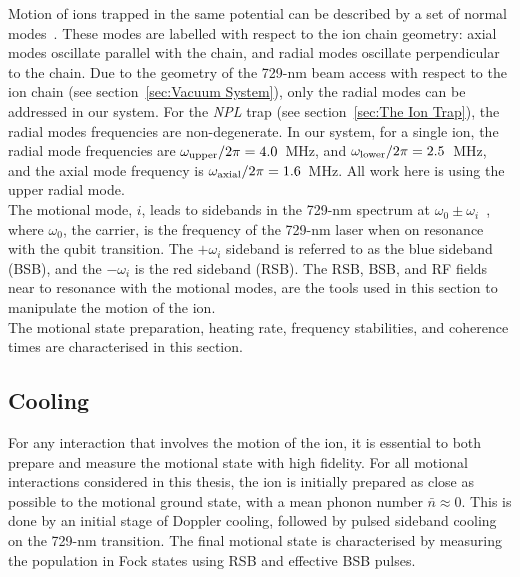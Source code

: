     Motion of ions trapped in the same potential can be described by a set of normal modes~\cite{james1998quantum}. These modes are labelled with respect to the ion chain geometry: axial modes oscillate parallel with the chain, and radial modes oscillate perpendicular to the chain. Due to the geometry of the 729-nm beam access with respect to the ion chain (see section~\ref{sec:Vacuum System}), only the radial modes can be addressed in our system. For the \emph{NPL} trap (see section~\ref{sec:The Ion Trap}), the radial modes frequencies are non-degenerate. In our system, for a single ion, the radial mode frequencies are $\omega_{\rm upper}/2\pi = 4.0$~\unit{\MHz}, and $\omega_{\rm lower}/2\pi = 2.5$~\unit{\MHz}, and the axial mode frequency is $\omega_{\rm axial}/2\pi = 1.6$~\unit{\MHz}. All work here is using the upper radial mode. \\
    The motional mode, $i$, leads to sidebands in the 729-nm spectrum at $\omega_0 \pm \omega_{i}$~\cite{ozeri2011tutorial}, where $\omega_0$, the carrier, is the frequency of the 729-nm laser when on resonance with the qubit transition. The $+\omega_i$ sideband is referred to as the blue sideband (BSB), and the $-\omega_i$ is the red sideband (RSB).
    The RSB, BSB, and RF fields near to resonance with the motional modes, are the tools used in this section to manipulate the motion of the ion.\\
    The motional state preparation, heating rate, frequency stabilities, and coherence times are characterised in this section.

\subsection{Cooling}
\label{sec:Cooling}

    For any interaction that involves the motion of the ion, it is essential to both prepare and measure the motional state with high fidelity. For all motional interactions considered in this thesis, the ion is initially prepared as close as possible to the motional ground state, with a mean phonon number $\bar{n} \approx 0$. This is done by an initial stage of Doppler cooling, followed by pulsed sideband cooling on the 729-nm transition. The final motional state is characterised by measuring the population in Fock states using RSB and effective BSB pulses.\\

